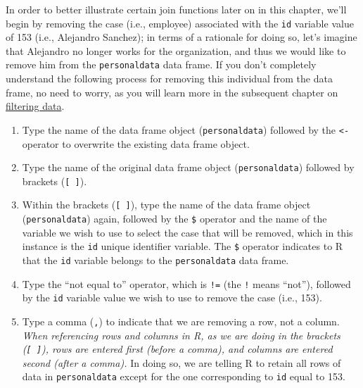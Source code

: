 \documentclass[]{book}
\newenvironment{Shaded}{\begin{snugshade}}{\end{snugshade}}
\newcommand{\DecValTok}[1]{\textcolor[rgb]{0.00,0.00,0.81}{#1}}
\newcommand{\StringTok}[1]{\textcolor[rgb]{0.31,0.60,0.02}{#1}}
\newcommand{\CommentTok}[1]{\textcolor[rgb]{0.56,0.35,0.01}{\textit{#1}}}
\newcommand{\OperatorTok}[1]{\textcolor[rgb]{0.81,0.36,0.00}{\textbf{#1}}}
\newcommand{\NormalTok}[1]{#1}
\providecommand{\tightlist}{%
  \setlength{\itemsep}{0pt}\setlength{\parskip}{0pt}}
\begin{document}
In order to better illustrate certain join functions later on in this
chapter, we'll begin by removing the case (i.e., employee) associated
with the \texttt{id} variable value of 153 (i.e., Alejandro Sanchez); in
terms of a rationale for doing so, let's imagine that Alejandro no
longer works for the organization, and thus we would like to remove him
from the \texttt{personaldata} data frame. If you don't completely
understand the following process for removing this individual from the
data frame, no need to worry, as you will learn more in the subsequent
chapter on \protect\hyperlink{filter}{filtering data}.

\begin{enumerate}
\def\labelenumi{\arabic{enumi}.}
\tightlist
\item
  Type the name of the data frame object (\texttt{personaldata})
  followed by the \texttt{\textless{}-} operator to overwrite the
  existing data frame object.
\item
  Type the name of the original data frame object
  (\texttt{personaldata}) followed by brackets (\texttt{{[}\ {]}}).
\item
  Within the brackets (\texttt{{[}\ {]}}), type the name of the data
  frame object (\texttt{personaldata}) again, followed by the
  \texttt{\$} operator and the name of the variable we wish to use to
  select the case that will be removed, which in this instance is the
  \texttt{id} unique identifier variable. The \texttt{\$} operator
  indicates to R that the \texttt{id} variable belongs to the
  \texttt{personaldata} data frame.
\item
  Type the ``not equal to'' operator, which is \texttt{!=} (the
  \texttt{!} means ``not''), followed by the \texttt{id} variable value
  we wish to use to remove the case (i.e., 153).
\item
  Type a comma (\texttt{,}) to indicate that we are removing a row, not
  a column. \emph{When referencing rows and columns in R, as we are
  doing in the brackets (\texttt{{[}\ {]}}), rows are entered first
  (before a comma), and columns are entered second (after a comma).} In
  doing so, we are telling R to retain all rows of data in
  \texttt{personaldata} except for the one corresponding to \texttt{id}
  equal to 153.
\end{enumerate}

\begin{Shaded}
\end{Shaded}
\end{document}
